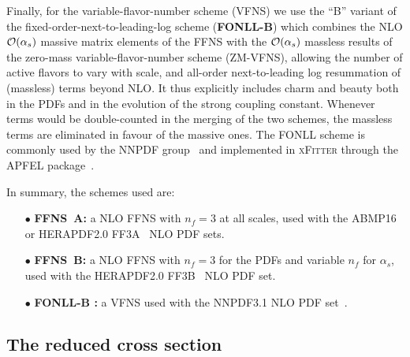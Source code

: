 \documentclass[pdftex,twocolumn,epjc3]{svjour3}          %
\newcommand{\abmp} {ABMP16\xspace}
\newcommand{\nnpdf} {NNPDF3.1\xspace}
\newcommand{\xfitter} {\textsc{xFitter}\xspace}
\newcommand{\ffns} {{FFNS~A}\xspace}
\newcommand{\ffnsb} {{FFNS~B}\xspace}
\newcommand{\ffthreea} {{\hbox{HERAPDF2.0} FF3A}\xspace}
\newcommand{\ffthreeb} {{\hbox{HERAPDF2.0} FF3B}\xspace}
\begin{document}
Finally, for the variable-flavor-number scheme (VFNS) we use the ``B''
variant of the fixed-order-next-to-leading-log scheme ({\bf FONLL-B})
which combines the NLO ${\cal O}(\alpha_s)$ massive matrix elements of
the FFNS with the ${\cal O}(\alpha_s)$ massless results of the
zero-mass variable-flavor-number scheme (ZM-VFNS), allowing the number
of active flavors to vary with scale, and all-order next-to-leading
log resummation of (massless) terms beyond NLO.  It thus explicitly
includes charm and beauty both in the PDFs and in the evolution of the
strong coupling constant.  Whenever terms would be double-counted in
the merging of the two schemes, the massless terms are eliminated in
favour of the massive ones. The FONLL scheme is commonly used by the
NNPDF group~\cite{Ball:2017nwa} and implemented in \xfitter through
the APFEL package~\cite{Bertone:2013vaa}.

In summary, the schemes used are:
\begin{itemize}
  \setlength\itemsep{1em}

\item[$\bullet$] {\bf \ffns :} a NLO FFNS with $n_f = 3$ at all
  scales, used with the \abmp~\cite{Alekhin:2018pai} or
  \ffthreea~\cite{Abramowicz:2015mha} NLO PDF sets.

\item[$\bullet$] {\bf \ffnsb :} a NLO FFNS with $n_f = 3$ for the PDFs
  and variable $n_f$ for $\alpha_s$, used with the
  \ffthreeb~\cite{Abramowicz:2015mha} NLO PDF set.

\item[$\bullet$] {\bf FONLL-B :} a VFNS used with the \nnpdf NLO PDF
  set~\cite{Ball:2017nwa}.
\end{itemize}


\subsection{The reduced cross section}\label{sec-redsigma}
\end{document}
